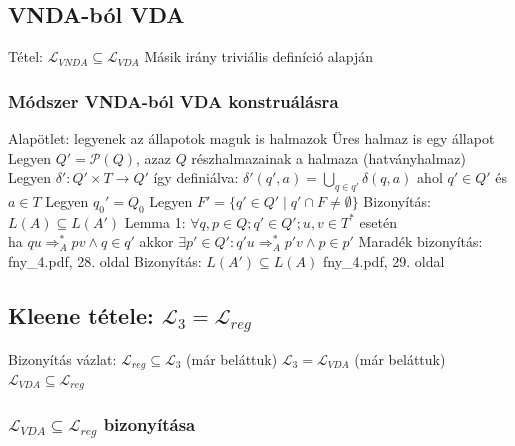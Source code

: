 \documentclass[12pt,a4paper]{article}
\newcommand{\atos}{\Rightarrow_A^*}
\begin{document}
\pagebreak

\subsection{VNDA-ból VDA}

\begin{outline}
	\1 Tétel: $\mathcal{L}_{VNDA} \subseteq \mathcal{L}_{VDA}$
	\1 Másik irány triviális definíció alapján	
\end{outline}

\subsubsection{Módszer VNDA-ból VDA konstruálásra}

\begin{outline}
	\1 Alapötlet: legyenek az állapotok maguk is halmazok
		\2 Üres halmaz is egy állapot
	\1 Legyen $Q' = \mathcal{P}(Q)$, azaz $Q$ részhalmazainak a halmaza (hatványhalmaz)
	\1 Legyen $\delta' : Q' \times T \to Q'$ így definiálva:
		\2 $\delta' (q',a) = \bigcup_{q \in q'} \delta(q,a)$ ahol $q' \in Q'$ és $a \in T$
	\1 Legyen $q_0' = Q_0$
	\1 Legyen $F' = \{q' \in Q' \;|\; q' \cap F \ne \emptyset\}$
	\1 Bizonyítás: $L(A) \subseteq L(A')$
		\2 Lemma 1: $\forall q,p \in Q; q' \in Q'; u,v \in T^*$ esetén\\
		ha $qu \atos pv \wedge q \in q'$ akkor $\exists p' \in Q': q'u \atos p'v \wedge p \in p'$
		\2 Maradék bizonyítás: fny\_4.pdf, 28. oldal
	\1 Bizonyítás: $L(A') \subseteq L(A)$
		\2 fny\_4.pdf, 29. oldal
\end{outline}

\pagebreak

\subsection{Kleene tétele: $\mathcal{L}_3 = \mathcal{L}_{reg}$}

\begin{outline}
	\1 Bizonyítás vázlat:
		\2 $\mathcal{L}_{reg} \subseteq \mathcal{L}_3$ (már beláttuk)
		\2 $\mathcal{L}_3 = \mathcal{L}_{VDA}$ (már beláttuk)
		\2 $\mathcal{L}_{VDA} \subseteq \mathcal{L}_{reg}$
\end{outline}

\subsubsection{$\mathcal{L}_{VDA} \subseteq \mathcal{L}_{reg}$ bizonyítása}
\end{document}
